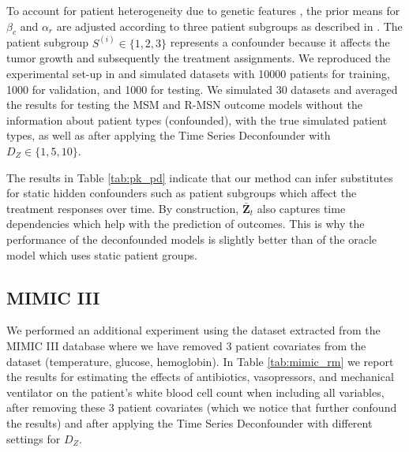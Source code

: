 \documentclass{article}
\newcommand{\vc}[1]{\mathbf{#1}}
\newcommand{\hist}[1]{\bar{\vc{#1}}}
\begin{document}
    To account for patient heterogeneity due to genetic features \citep{bartsch2007genetic}, the prior means for $\beta_c$ and  $\alpha_r$ are adjusted according to three patient subgroups as described in \citet{lim2018forecasting}. The patient subgroup $S^{(i)} \in \{1, 2, 3\}$ represents a confounder because it affects the tumor growth and subsequently the treatment assignments. We reproduced the experimental set-up in \citet{lim2018forecasting} and simulated datasets with 10000 patients for training, 1000 for validation, and 1000 for testing. We simulated 30 datasets and averaged the results for testing the MSM and R-MSN outcome models without the information about patient types (confounded),  with the true simulated patient types, as well as after applying the Time Series Deconfounder with $D_Z \in \{1, 5, 10\}$.  
    
    The results in Table \ref{tab:pk_pd} indicate that our method can infer substitutes for static hidden confounders such as patient subgroups which affect the treatment responses over time.  By construction, $\hist{Z}_t$ also captures time dependencies which help with the prediction of outcomes. This is why the performance of the deconfounded models is slightly better than of the oracle model which uses static patient groups. 
	
	\subsection{MIMIC III}
	
	We performed an additional experiment using the dataset extracted from the MIMIC III database where we have removed 3 patient covariates from the dataset (temperature, glucose, hemoglobin). In Table \ref{tab:mimic_rm} we report the results for estimating the effects of antibiotics, vasopressors, and mechanical ventilator on the patient's white blood cell count when including all variables, after removing these 3 patient covariates (which we notice that further confound the results) and after applying the Time Series Deconfounder with different settings for $D_Z$. 
	
\end{document}
